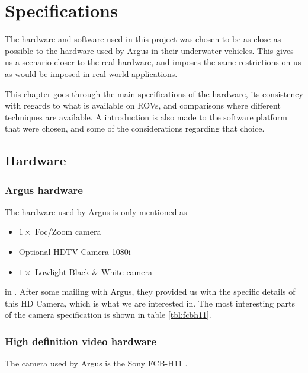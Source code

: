 
\chapter{Specifications}
The hardware and software used in this project was chosen to be as close as possible to the 
hardware used by Argus in their underwater vehicles. This gives us 
a scenario closer to the real hardware, and imposes the same 
restrictions on us as would be imposed in real world applications.

This chapter goes through the main specifications of the hardware, its consistency with 
regards to what is available on ROVs, and comparisons where different techniques are available.
A introduction is also made to the software platform that were chosen, and some of the considerations 
regarding that choice.

\section{Hardware}

\subsection{Argus hardware}\label{sec:argus_hw}
The hardware used by Argus is only mentioned as 

\begin{itemize}
	\item $1\times$ Foc/Zoom camera
	\item Optional HDTV Camera 1080i
	\item $1\times$ Lowlight Black \& White camera
\end{itemize}

in \citet{argusROV}. After some mailing with Argus, they provided us 
with the specific details of this HD Camera, which is what we are interested in. 
The most interesting parts of the camera specification is shown in table \vref{tbl:fcbh11}.

\subsection{High definition video hardware}\label{sec:fcb_h11_hw}
The camera used by Argus is the Sony FCB-H11 \citet{fcbh11}. 

